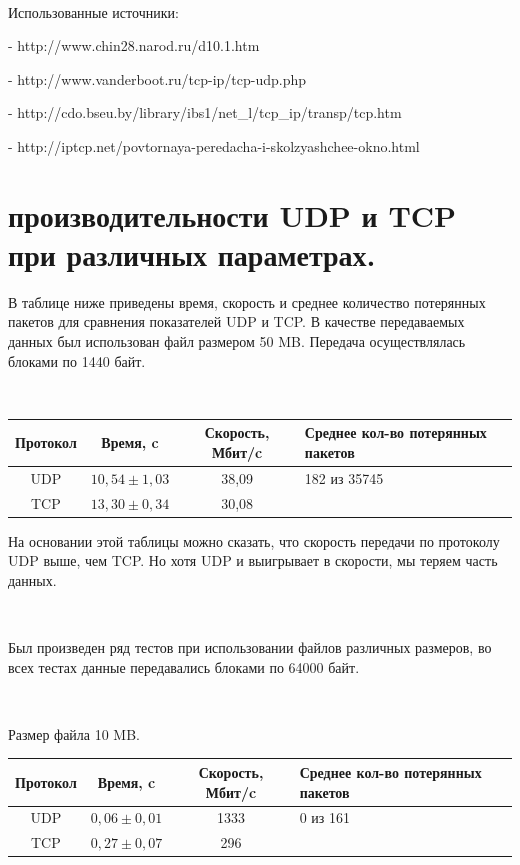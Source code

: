 \documentclass{article}
\begin{document}
~\

Использованные источники:

- http://www.chin28.narod.ru/d10.1.htm 

- http://www.vanderboot.ru/tcp-ip/tcp-udp.php

- http://cdo.bseu.by/library/ibs1/net\_l/tcp\_ip/transp/tcp.htm

- http://iptcp.net/povtornaya-peredacha-i-skolzyashchee-okno.html

\newpage

\section{\textbf{ производительности UDP и TCP при различных параметрах.}}

В таблице ниже приведены время, скорость и среднее количество потерянных пакетов для сравнения показателей UDP и TCP. В качестве передаваемых данных был использован файл размером 50 MB. Передача осуществлялась блоками по 1440 байт.

~\

\begin{table}[h]
\begin{tabular}{|c|c|c|p{130pt}|}
\hline
Протокол & Время, c & Скорость, Мбит/c & Среднее кол-во потерянных пакетов \\
\hline
UDP & $10,54 \pm 1,03$ & 38,09 & 182 из 35745\\
TCP & $13,30 \pm 0,34$ & 30,08 &  \\
\hline
\end{tabular}
\end{table}

На основании этой таблицы можно сказать, что скорость передачи по протоколу UDP выше, чем TCP. Но хотя UDP и выигрывает в скорости, мы теряем часть данных.

~\

Был произведен ряд тестов при использовании файлов различных размеров, во всех тестах данные передавались блоками по 64000 байт.

~\

Размер файла 10 MB.

\begin{table}[h!]
\begin{tabular}{|c|c|c|p{130pt}|}
\hline
Протокол & Время, c & Скорость, Мбит/c & Среднее кол-во потерянных пакетов \\
\hline
UDP & $0,06 \pm 0,01$ & 1333 & 0 из 161\\
TCP & $0,27 \pm 0,07$ & 296 &  \\
\hline
\end{tabular}
\end{table}
\end{document}
